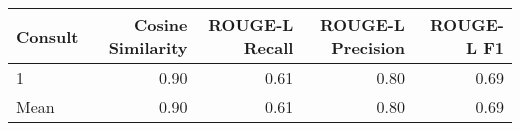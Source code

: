 \begin{tabular}{lrrrr}
\toprule
Consult & Cosine Similarity & ROUGE-L Recall & ROUGE-L Precision & ROUGE-L F1 \\
\midrule
1 & 0.90 & 0.61 & 0.80 & 0.69 \\
Mean & 0.90 & 0.61 & 0.80 & 0.69 \\
\bottomrule
\end{tabular}
